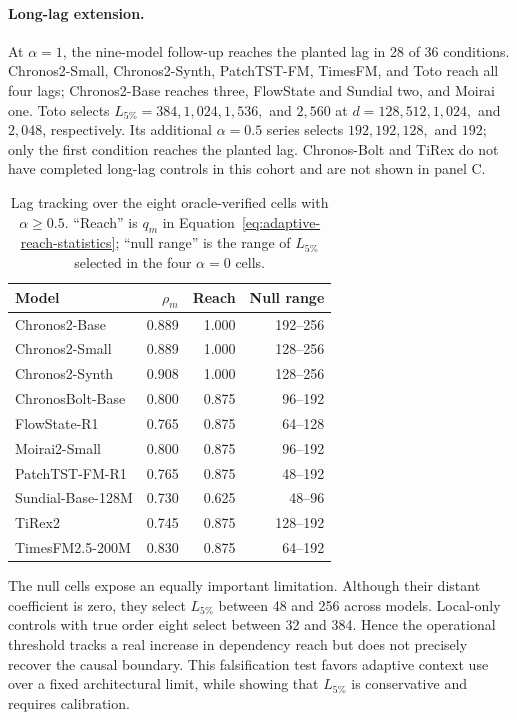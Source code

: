 \paragraph{Long-lag extension.}
At $\alpha=1$, the nine-model follow-up reaches the planted lag in 28 of 36
conditions.  Chronos2-Small, Chronos2-Synth, PatchTST-FM, TimesFM, and Toto
reach all four lags; Chronos2-Base reaches three, FlowState and Sundial two,
and Moirai one.  Toto selects $L_{5\%}=384,1{,}024,1{,}536,$ and $2{,}560$ at
$d=128,512,1{,}024,$ and $2{,}048$, respectively.  Its additional
$\alpha=0.5$ series selects $192,192,128,$ and $192$; only the first condition
reaches the planted lag.  Chronos-Bolt and TiRex do not have completed
long-lag controls in this cohort and are not shown in panel C.

\begin{table}[t]
    \centering
    \footnotesize
    \setlength{\tabcolsep}{4pt}
    \caption{Lag tracking over the eight oracle-verified cells with
    $\alpha\geq0.5$.  ``Reach'' is $q_m$ in
    Equation~\ref{eq:adaptive-reach-statistics}; ``null range'' is the range of
    $L_{5\%}$ selected in the four $\alpha=0$ cells.}
    \label{tab:adaptive-reach}
    \begin{tabular}{lrrr}
        \toprule
        Model & $\rho_m$ & Reach & Null range \\
        \midrule
        Chronos2-Base      & 0.889 & 1.000 & 192--256 \\
        Chronos2-Small     & 0.889 & 1.000 & 128--256 \\
        Chronos2-Synth     & 0.908 & 1.000 & 128--256 \\
        ChronosBolt-Base   & 0.800 & 0.875 &  96--192 \\
        FlowState-R1       & 0.765 & 0.875 &  64--128 \\
        Moirai2-Small      & 0.800 & 0.875 &  96--192 \\
        PatchTST-FM-R1     & 0.765 & 0.875 &  48--192 \\
        Sundial-Base-128M  & 0.730 & 0.625 &  48--96  \\
        TiRex2             & 0.745 & 0.875 & 128--192 \\
        TimesFM2.5-200M    & 0.830 & 0.875 &  64--192 \\
        \bottomrule
    \end{tabular}
\end{table}

The null cells expose an equally important limitation.  Although their distant
coefficient is zero, they select $L_{5\%}$ between 48 and 256 across models.
Local-only controls with true order eight select between 32 and 384.  Hence the
operational threshold tracks a real increase in dependency reach but does not
precisely recover the causal boundary.  This falsification test favors adaptive
context use over a fixed architectural limit, while showing that
$L_{5\%}$ is conservative and requires calibration.

